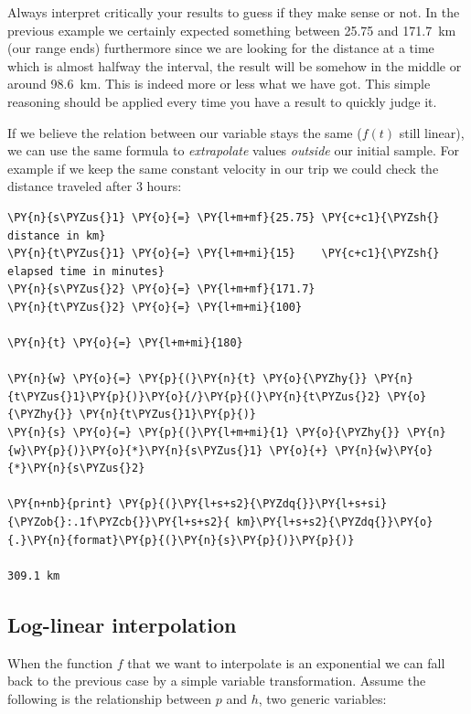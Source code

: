 Always interpret critically your results to guess if they make sense or not. In the previous example we certainly expected something between 25.75 and 171.7~km (our range ends) furthermore since we are looking for the distance at a time which is almost halfway the interval, the result will be somehow in the middle or around 98.6~km. This is indeed more or less what we have got.
This simple reasoning should be applied every time you have a result to quickly judge it.

If we believe the relation between our variable stays the same ($f(t)$ still linear), we can use the same formula to \emph{extrapolate} values \emph{outside} our initial sample. For example if we keep the same constant velocity in our trip we could check the distance traveled after 3 hours:

\begin{tcolorbox}[breakable, size=fbox, boxrule=1pt, pad at break*=1mm,colback=cellbackground, colframe=cellborder]
\begin{Verbatim}[commandchars=\\\{\}]
\PY{n}{s\PYZus{}1} \PY{o}{=} \PY{l+m+mf}{25.75} \PY{c+c1}{\PYZsh{} distance in km}
\PY{n}{t\PYZus{}1} \PY{o}{=} \PY{l+m+mi}{15}    \PY{c+c1}{\PYZsh{} elapsed time in minutes}
\PY{n}{s\PYZus{}2} \PY{o}{=} \PY{l+m+mf}{171.7}
\PY{n}{t\PYZus{}2} \PY{o}{=} \PY{l+m+mi}{100}

\PY{n}{t} \PY{o}{=} \PY{l+m+mi}{180}

\PY{n}{w} \PY{o}{=} \PY{p}{(}\PY{n}{t} \PY{o}{\PYZhy{}} \PY{n}{t\PYZus{}1}\PY{p}{)}\PY{o}{/}\PY{p}{(}\PY{n}{t\PYZus{}2} \PY{o}{\PYZhy{}} \PY{n}{t\PYZus{}1}\PY{p}{)}
\PY{n}{s} \PY{o}{=} \PY{p}{(}\PY{l+m+mi}{1} \PY{o}{\PYZhy{}} \PY{n}{w}\PY{p}{)}\PY{o}{*}\PY{n}{s\PYZus{}1} \PY{o}{+} \PY{n}{w}\PY{o}{*}\PY{n}{s\PYZus{}2}

\PY{n+nb}{print} \PY{p}{(}\PY{l+s+s2}{\PYZdq{}}\PY{l+s+si}{\PYZob{}:.1f\PYZcb{}}\PY{l+s+s2}{ km}\PY{l+s+s2}{\PYZdq{}}\PY{o}{.}\PY{n}{format}\PY{p}{(}\PY{n}{s}\PY{p}{)}\PY{p}{)}

309.1 km
\end{Verbatim}
\end{tcolorbox}

\subsection{Log-linear interpolation}\label{log-linear-interpolation}
When the function $f$ that we want to interpolate is an exponential we can fall back to the previous case by a simple variable transformation. 
Assume the following is the relationship between $p$ and $h$, two generic variables:

